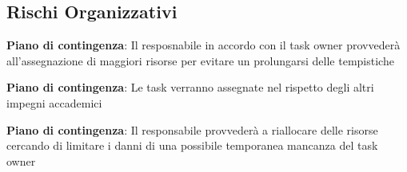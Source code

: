 	\subsection{Rischi Organizzativi}

		\def\productquality{
    			{
        			Calcolo
				Tempistiche e Costi
				RO1,
        			Causa RT1 le valutazioni sulle tempistiche e i costi economici potrebbero essere imprecisi, 
        			Vengono predisposte delle tabelle sulle tempistiche e sarà compito del responsabile monitorare l'andamento dello sviluppo,
        			Occorrenza: Alta 
				Pericolosità: Alta
    			},
		}
		
		\textbf{Piano di contingenza}: Il resposnabile in accordo con il task owner provvederà all'assegnazione di maggiori risorse per evitare un prolungarsi delle tempistiche
		\def\productquality{
			{
        			Impegni
				Accademici
				RO2,
        			Il periodo di sviluppo del progetto inizia a ridosso della sessione d'esami universitaria a cui tutti i membri del gruppo si vedono impegnati in diverse occasioni, 
        			In sede di riunione il team ha deciso di condividere i periodi di tempo in cui il loro contributo al progetto potrebbe calare o venir meno,
        			Occorrenza: Media 
				Pericolosità: Media
    			},
		}
		
		\textbf{Piano di contingenza}: Le task verranno assegnate nel rispetto degli altri impegni accademici
		\pagebreak
		\def\productquality{
			{
        			Impegni
				Personali
				RO3,
        			è possibile il verificarsi di imprevisti personali che potrebbero influire nel corretto sviluppo del progetto, 
        			è compito di ogni membro del gruppo segnalare un eventuale imprevisto al responsabile del gruppo in modo da permettergli di riorganizzare l'agenda,
        			Occorrenza: Bassa 
				Pericolosità: Bassa
    			},
		}
		
		\textbf{Piano di contingenza}: Il responsabile provvederà a riallocare delle risorse cercando di limitare i danni di una possibile temporanea mancanza del task owner


